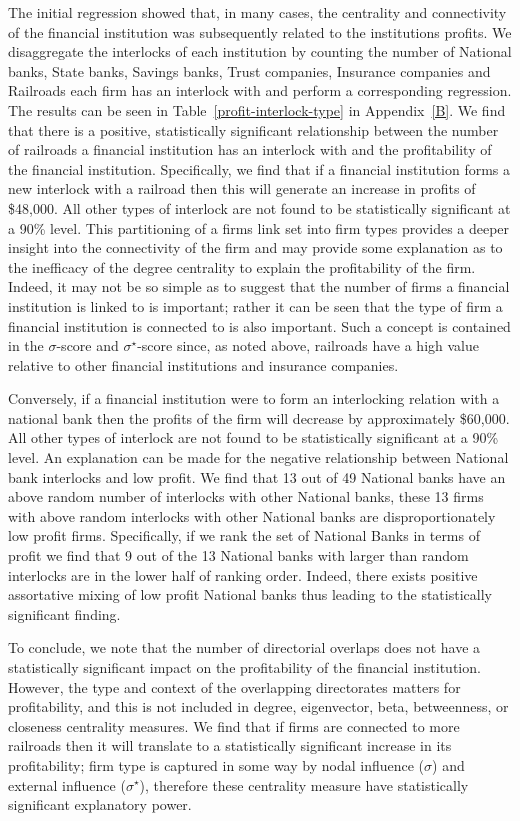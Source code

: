 The initial regression showed that, in many cases, the centrality and connectivity of the financial institution was subsequently related to the institutions profits. We disaggregate the interlocks of each institution by counting the number of National banks, State banks, Savings banks, Trust companies, Insurance companies and Railroads each firm has an interlock with and perform a corresponding regression. The results can be seen in Table~\ref{profit-interlock-type} in Appendix~\ref{B}. We find that there is a positive, statistically significant relationship between the number of railroads a financial institution has an interlock with and the profitability of the financial institution. Specifically, we find that if a financial institution forms a new interlock with a railroad then this will generate an increase in profits of \$48,000. All other types of interlock are not found to be statistically significant at a 90\% level. This partitioning of a firms link set into firm types provides a deeper insight into the connectivity of the firm and may provide some explanation as to the inefficacy of the degree centrality to explain the profitability of the firm. Indeed, it may not be so simple as to suggest that the number of firms a financial institution is linked to is important; rather it can be seen that the type of firm a financial institution is connected to is also important. Such a concept is contained in the $\sigma$-score and $\sigma^{\star}$-score since, as noted above, railroads have a high value relative to other financial institutions and insurance companies.

Conversely, if a financial institution were to form an interlocking relation with a national bank then the profits of the firm will decrease by approximately \$60,000. All other types of interlock are not found to be statistically significant at a 90\% level. An explanation can be made for the negative relationship between National bank interlocks and low profit. We find that 13 out of 49 National banks have an above random number of interlocks with other National banks, these 13 firms with above random interlocks with other National banks are disproportionately low profit firms. Specifically, if we rank the set of National Banks in terms of profit we find that 9 out of the 13 National banks with larger than random interlocks are in the lower half of ranking order. Indeed, there exists positive assortative mixing of low profit National banks thus leading to the statistically significant finding.

To conclude, we note that the number of directorial overlaps does not have a statistically significant impact on the profitability of the financial institution. However, the type and context of the overlapping directorates matters for profitability, and this is not included in degree, eigenvector, beta, betweenness, or closeness centrality measures. We find that if firms are connected to more railroads then it will translate to a statistically significant increase in its profitability; firm type is captured in some way by nodal influence ($\sigma$) and external influence ($\sigma^{\star}$), therefore these centrality measure have statistically significant explanatory power.


